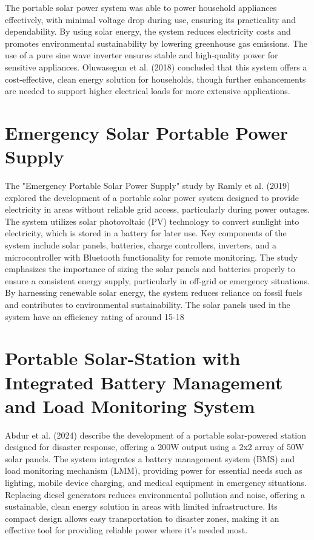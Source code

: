 {The portable solar power system was able to power household appliances effectively, with minimal voltage drop during use, ensuring its practicality and dependability. By using solar energy, the system reduces electricity costs and promotes environmental sustainability by lowering greenhouse gas emissions. The use of a pure sine wave inverter ensures stable and high-quality power for sensitive appliances. Oluwasegun et al. (2018) concluded that this system offers a cost-effective, clean energy solution for households, though further enhancements are needed to support higher electrical loads for more extensive applications.

\section{Emergency Solar Portable Power Supply}

The "Emergency Portable Solar Power Supply" study by Ramly et al. (2019) explored the development of a portable solar power system designed to provide electricity in areas without reliable grid access, particularly during power outages. The system utilizes solar photovoltaic (PV) technology to convert sunlight into electricity, which is stored in a battery for later use. Key components of the system include solar panels, batteries, charge controllers, inverters, and a microcontroller with Bluetooth functionality for remote monitoring. The study emphasizes the importance of sizing the solar panels and batteries properly to ensure a consistent energy supply, particularly in off-grid or emergency situations. By harnessing renewable solar energy, the system reduces reliance on fossil fuels and contributes to environmental sustainability. The solar panels used in the system have an efficiency rating of around 15-18%

\section{Portable Solar-Station with Integrated Battery Management and Load Monitoring System}

Abdur et al. (2024) describe the development of a portable solar-powered station designed for disaster response, offering a 200W output using a 2x2 array of 50W solar panels. The system integrates a battery management system (BMS) and load monitoring mechanism (LMM), providing power for essential needs such as lighting, mobile device charging, and medical equipment in emergency situations. Replacing diesel generators reduces environmental pollution and noise, offering a sustainable, clean energy solution in areas with limited infrastructure. Its compact design allows easy transportation to disaster zones, making it an effective tool for providing reliable power where it’s needed most.

}
